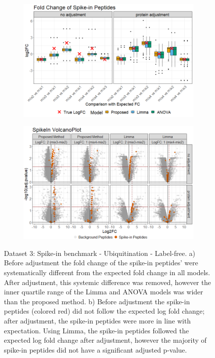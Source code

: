 \documentclass[mcp]{article}
\numberwithin{table}{section}
\begin{document}
\begin{figure}[ht]
{}
\label{fig:computer_sim}
\end{figure}


\begin{figure}[ht]
\centering
\begin{subfigure}[c]{0.825\linewidth}
\includegraphics[width=1\textwidth]{images/spike_in_fc.png}
\caption{}
\label{fig:spikein_boxplot}
\end{subfigure}
\begin{subfigure}[c]{0.825\linewidth}
\includegraphics[width=1\textwidth]{images/spike_in_volcano.png}
\caption{}
\label{fig:spikein_prop_volcano}
\end{subfigure}
\caption{Dataset 3: Spike-in benchmark - Ubiquitination - Label-free. a) Before adjustment the fold change of the spike-in peptides' were systematically different from the expected fold change in all models. After adjustment, this systemic difference was removed, however the inner quartile range of the Limma and ANOVA models was wider than the proposed method. b) Before adjustment the spike-in peptides (colored red) did not follow the expected log fold change; after adjustment, the spike-in peptides were more in line with expectation. Using Limma, the spike-in peptides followed the expected log fold change after adjustment, however the majority of spike-in peptides did not have a significant adjusted p-value.}
\label{fig:spikein_volcano}
\end{figure}
\end{document}
